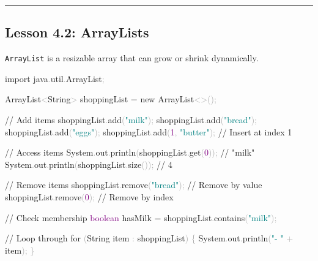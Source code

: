 \documentclass[
  justified,
  openright,
]{tufte-book}
\newcommand{\BuiltInTok}[1]{#1}
\newcommand{\CommentTok}[1]{\textcolor{MidGray}{#1}}
\newcommand{\ControlFlowTok}[1]{\textcolor{BrandBlue}{#1}}
\newcommand{\DataTypeTok}[1]{\textcolor{Purple}{#1}}
\newcommand{\DecValTok}[1]{\textcolor{Purple}{#1}}
\newcommand{\FunctionTok}[1]{\textcolor{BrandBlue}{#1}}
\newcommand{\ImportTok}[1]{\textcolor{BrandAccent}{#1}}
\newcommand{\KeywordTok}[1]{\textcolor{BrandBlue}{#1}}
\newcommand{\NormalTok}[1]{#1}
\newcommand{\OperatorTok}[1]{\textcolor{DarkGray}{#1}}
\newcommand{\StringTok}[1]{\textcolor{Teal}{#1}}
\newenvironment{Shaded}{%
  \begin{snugshade}
}{%
  \end{snugshade}
}
\begin{document}
\begin{center}\rule{0.5\linewidth}{0.5pt}\end{center}

\subsection{Lesson 4.2: ArrayLists}\label{lesson-4.2-arraylists-1}

\texttt{ArrayList} is a resizable array that can grow or shrink
dynamically.

\begin{Shaded}
\begin{Highlighting}[]
\KeywordTok{import} \ImportTok{java}\OperatorTok{.}\ImportTok{util}\OperatorTok{.}\ImportTok{ArrayList}\OperatorTok{;}

\BuiltInTok{ArrayList}\OperatorTok{\textless{}}\BuiltInTok{String}\OperatorTok{\textgreater{}}\NormalTok{ shoppingList }\OperatorTok{=} \KeywordTok{new} \BuiltInTok{ArrayList}\OperatorTok{\textless{}\textgreater{}();}

\CommentTok{// Add items}
\NormalTok{shoppingList}\OperatorTok{.}\FunctionTok{add}\OperatorTok{(}\StringTok{"milk"}\OperatorTok{);}
\NormalTok{shoppingList}\OperatorTok{.}\FunctionTok{add}\OperatorTok{(}\StringTok{"bread"}\OperatorTok{);}
\NormalTok{shoppingList}\OperatorTok{.}\FunctionTok{add}\OperatorTok{(}\StringTok{"eggs"}\OperatorTok{);}
\NormalTok{shoppingList}\OperatorTok{.}\FunctionTok{add}\OperatorTok{(}\DecValTok{1}\OperatorTok{,} \StringTok{"butter"}\OperatorTok{);}   \CommentTok{// Insert at index 1}

\CommentTok{// Access items}
\BuiltInTok{System}\OperatorTok{.}\FunctionTok{out}\OperatorTok{.}\FunctionTok{println}\OperatorTok{(}\NormalTok{shoppingList}\OperatorTok{.}\FunctionTok{get}\OperatorTok{(}\DecValTok{0}\OperatorTok{));}          \CommentTok{// "milk"}
\BuiltInTok{System}\OperatorTok{.}\FunctionTok{out}\OperatorTok{.}\FunctionTok{println}\OperatorTok{(}\NormalTok{shoppingList}\OperatorTok{.}\FunctionTok{size}\OperatorTok{());}           \CommentTok{// 4}

\CommentTok{// Remove items}
\NormalTok{shoppingList}\OperatorTok{.}\FunctionTok{remove}\OperatorTok{(}\StringTok{"bread"}\OperatorTok{);}                     \CommentTok{// Remove by value}
\NormalTok{shoppingList}\OperatorTok{.}\FunctionTok{remove}\OperatorTok{(}\DecValTok{0}\OperatorTok{);}                           \CommentTok{// Remove by index}

\CommentTok{// Check membership}
\DataTypeTok{boolean}\NormalTok{ hasMilk }\OperatorTok{=}\NormalTok{ shoppingList}\OperatorTok{.}\FunctionTok{contains}\OperatorTok{(}\StringTok{"milk"}\OperatorTok{);}

\CommentTok{// Loop through}
\ControlFlowTok{for} \OperatorTok{(}\BuiltInTok{String}\NormalTok{ item }\OperatorTok{:}\NormalTok{ shoppingList}\OperatorTok{)} \OperatorTok{\{}
    \BuiltInTok{System}\OperatorTok{.}\FunctionTok{out}\OperatorTok{.}\FunctionTok{println}\OperatorTok{(}\StringTok{"{-} "} \OperatorTok{+}\NormalTok{ item}\OperatorTok{);}
\OperatorTok{\}}
\end{Highlighting}
\end{Shaded}
\end{document}
